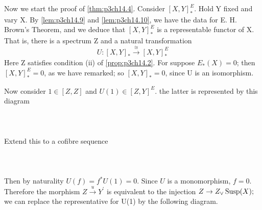 \documentclass[../main]{subfiles}
\begin{document}
Now we start the proof of \ref{thm:p3ch14.4}. Consider $ \left[X,Y\right]^E_{\ast}$. Hold Y fixed and vary X. By \ref{lem:p3ch14.9} and \ref{lem:p3ch14.10}, we have the data for E. H. Brown's Theorem, and we deduce that  $ \left[X,Y\right]^E_{\ast}$ is a representable functor of X. That is, there is a spectrum Z and a natural transformation
$$
U\colon  \left[X,Y\right]_{\ast} \xrightarrow{\cong}  \left[X,Y\right]^E_{\ast}
$$ 
Here Z satisfies condition (ii) of \ref{prop:p3ch14.2}. For suppose $E_{\ast}(X)=0$; then $ \left[X,Y\right]^E_{\ast}=0$, as we have remarked; so $ \left[X,Y\right]_{\ast}=0$, since U is an isomorphism.

Now consider $1 \in \left[ Z,Z \right] $ and $U(1) \in \left[Z,Y\right]^E  $. the latter is represented by this diagram
~\\~\\
~\\~\\
Extend this to a cofibre sequence 
~\\~\\
~\\~\\
Then by naturality $U(f)=f^\ast U(1)=0$. Since $U$ is a monomorphism, $f=0$. Therefore the morphism $Z\xrightarrow{u} Y^{\prime}  $ is equivalent to the injection $Z  \to Z_{\vee}\mathop{\mathrm{Susp}}(X);$ we can replace the representative for U(1) by the following diagram.
~\\~\\
~\\~\\
\end{document}
